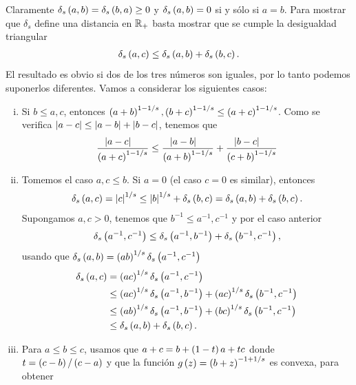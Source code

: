 \begin{dem}
	Claramente $\delta_{s}\left( a,b \right) = \delta_{s}\left( b,a \right) \ge 0$ y $\delta_{s}\left( a,b \right) = 0$ si y sólo si $a = b$.
	Para mostrar que $\delta_{s}$ define una distancia en $\mathbb{R}_{+}$ basta mostrar que se cumple la desigualdad triangular
	\begin{align*}
	\delta_{s}\left( a,c \right) \le \delta_{s}\left( a,b \right) + \delta_{s}\left( b,c \right).
	\end{align*}
	El resultado es obvio si dos de los tres números son iguales, por lo tanto podemos suponerlos diferentes. Vamos a considerar los siguientes casos:
	\begin{enumerate}[i)]
		\item Si $b \le a,c$, entonces $\left( a + b \right)^{1-1/s},\left( b + c \right)^{1-1/s} \le \left( a + c \right)^{1-1/s}$.
		Como se verifica $\left| a-c \right| \le \left| a-b \right| + \left| b-c \right|$, tenemos que
		\begin{align*}
		\dfrac{\left| a - c \right|\ \ \ }{\left( a + c \right)^{1-1/s}} \le \dfrac{\left| a - b \right|\ \ \ }{\left( a + b \right)^{1-1/s}} 
		+ \dfrac{\left| b - c \right|\ \ \ }{\left( c + b \right)^{1-1/s}}
		\end{align*}
		\item Tomemos el caso $a,c \le b$. Si $a=0$ (el caso $c=0$ es similar), entonces 
		\begin{align*}
		\delta_{s}\left( a,c \right) = \left| c \right|^{1/s} \le \left| b \right|^{1/s} + \delta_{s}\left( b,c \right) = \delta_{s}\left( a,b \right) + \delta_{s}\left( b,c \right).
		\end{align*}
		Supongamos $a,c>0$, tenemos que $b^{-1} \le a^{-1},c^{-1}$ y por el caso anterior
		\begin{align*}
		\delta_{s}\left( a^{-1},c^{-1} \right) \le \delta_{s}\left( a^{-1},b^{-1} \right) + \delta_{s}\left( b^{-1},c^{-1} \right),
		\end{align*}
		usando que $\delta_{s}\left( a,b \right) = \left( a b \right)^{1/s}\delta_{s}\left( a^{-1},c^{-1} \right)$
		\begin{align*}
		\delta_{s}\left( a,c \right) & = \left( a c \right)^{1/s} \delta_{s}\left( a^{-1},c^{-1} \right) \\
		& \le \left( a c \right)^{1/s} \delta_{s}\left( a^{-1},b^{-1} \right) + \left( a c \right)^{1/s} \delta_{s}\left( b^{-1},c^{-1} \right) \\
		& \le \left( a b \right)^{1/s} \delta_{s}\left( a^{-1},b^{-1} \right) + \left( b c \right)^{1/s} \delta_{s}\left( b^{-1},c^{-1} \right) \\
		& \le \delta_{s}\left( a,b \right) + \delta_{s}\left( b,c \right).
		\end{align*}
		\item Para $a \le b \le c$, usamos que $a + c = b + \left( 1-t \right) a + t c$
		donde $t = \left( c-b \right)/\left( c-a \right)$ y que la función $g\left( z \right) = \left( b+z \right)^{-1+1/s}$ es convexa, para obtener

\end{enumerate}
\end{dem}
